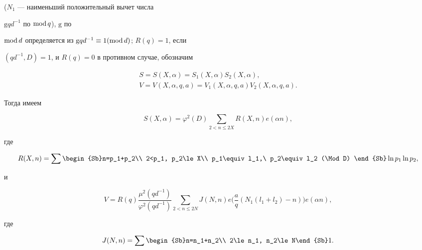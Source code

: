 ($N_1$ --- наименьший положительный вычет числа


$\mathrm g qd^{-1}$ по $\operatorname{mod} q$), $\mathrm g$ по


$\operatorname{mod} d$ определяется из $\mathrm g qd^{-1}\equiv 1(\operatorname{mod} d)$; $R(q)=1$, если


$( qd^{-1},D)=1$, и $R(q)=0$ в противном случае, обозначим


\begin{equation}


\begin{array}{c}


S=S(X,\alpha)=S_1(X,\alpha) S_2(X,\alpha),\\[2mm]


V=V(X,\alpha,q,a)=V_1(X,\alpha,q,a) V_2(X,\alpha,q,a).


\end{array}


\end{equation} 


Тогда имеем


\begin{equation}


S(X,\alpha)=\varphi^2(D)\sum_{2<n\le 2X}R(X,n) e(\alpha n),


\end{equation}


где


\begin{equation}


R(X,n)=\sum\begin{Sb}n=p_1+p_2\\ 2<p_1, p_2\le X\\


p_1\equiv l_1,\ p_2\equiv l_2 (\Mod D) \end{Sb}


\ln p_1\ln p_2,


\end{equation}


и


\begin{equation}


V=R(q)\frac{\mu^2(qd^{-1})}{\varphi^2 (qd^{-1})}


\sum_{2<n\le 2N}J(N,n)e\bigg(\frac aq(N_1(l_1+l_2)-n)\bigg)e(\alpha n),


\end{equation}


где


\begin{equation}


J(N,n)=\sum\begin{Sb}n=n_1+n_2\\ 2\le n_1, n_2\le N\end{Sb}1.


\end{equation}


